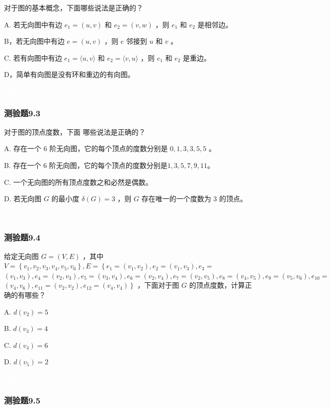 \documentclass[UTF8, heading=true]{ctexart}
\begin{document}
对于图的基本概念，下面哪些说法是正确的？

A. 若无向图中有边 $e_1=(u, v)$ 和 $e_2=(v, w)$ ，则 $e_1$ 和 $e_2$ 是相邻边。

B，若无向图中有边 $e=(u, v)$ ，则 $e$ 邻接到 $u$ 和 $v$ 。

C. 若有向图中有边 $e_1=\langle u, v\rangle$ 和 $e_2=\langle v, u\rangle$ ，则 $e_1$ 和 $e_2$ 是重边。

D，简单有向图是没有环和重边的有向图。

\textcolor{white}{答案：AD}

\subsubsection{测验题9.3}

对于图的顶点度数，下面 哪些说法是正确的？

A. 存在一个 6 阶无向图，它的每个顶点的度数分别是 $0,1,3,3,5,5$ 。

B. 存在一个 6 阶无向图，它的每个顶点的度数分别是$1,3,5,7,9,11$。

C. 一个无向图的所有顶点度数之和必然是偶数。

D.  若无向图 $G$ 的最小度 $\delta(G)=3$ ，则 $G$ 存在唯一的一个度数为 3 的顶点。

\textcolor{white}{答案：BC}


\subsubsection{测验题9.4}

给定无向图 $G=(V, E)$ ，其中 $V=\left\{v_1, v_2, v_3, v_4, v_5, v_6\right\}, E=\left\{e_1=\left(v_1, v_2\right), e_2=\left(v_1, v_3\right), e_3=\right.$ $\left(v_1, v_3\right), e_4=\left(v_2, v_3\right), e_5=\left(v_3, v_4\right), e_6=\left(v_2, v_4\right), e_7=\left(v_2, v_5\right), e_8=\left(v_4, v_5\right), e_9=\left(v_5, v_6\right), e_{10}=$ $\left.\left(v_4, v_6\right), e_{11}=\left(v_2, v_2\right), e_{12}=\left(v_4, v_4\right)\right\}$ ，下面对于图 $G$ 的顶点度数，计算正确的有哪些？

A. $d\left(v_2\right)=5$

B. $d\left(v_3\right)=4$

C. $d\left(v_4\right)=6$

D. $ d\left(v_5\right)=2$

\textcolor{white}{答案：BC}

\subsubsection{测验题9.5}
\end{document}
